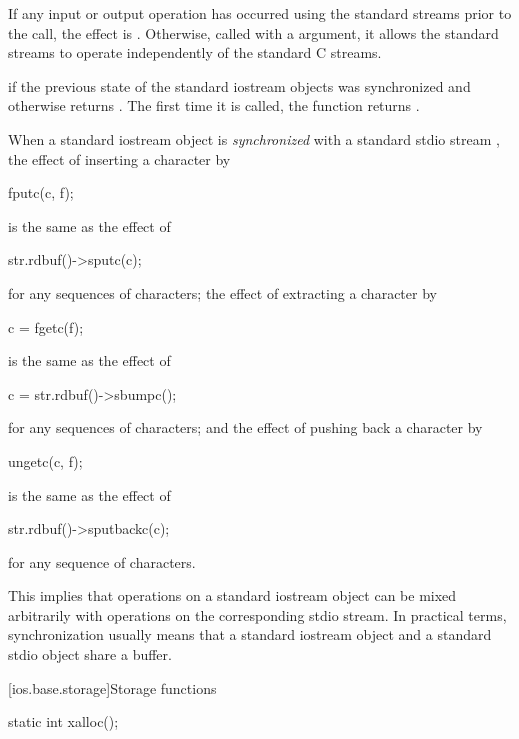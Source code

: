 \begin{itemdescr}
\pnum
\effects
If any input or output operation has occurred using the standard streams prior to the
call, the effect is
.
Otherwise, called with a  argument, it allows the standard streams to
operate independently of the standard C streams.

\pnum
\returns
{}
if the previous state of the standard iostream objects
was synchronized and otherwise returns
.
The first time it is called,
the function returns
.

\pnum
\remarks
When a standard iostream object  is
\textit{synchronized}
with a standard stdio stream , the effect of inserting a character  by
\begin{codeblock}
fputc(c, f);
\end{codeblock}
is the same as the effect of
\begin{codeblock}
str.rdbuf()->sputc(c);
\end{codeblock}
for any sequences of characters; the effect of extracting a character  by
\begin{codeblock}
c = fgetc(f);
\end{codeblock}
is the same as the effect of
\begin{codeblock}
c = str.rdbuf()->sbumpc();
\end{codeblock}
for any sequences of characters; and the effect of pushing back a character  by
\begin{codeblock}
ungetc(c, f);
\end{codeblock}
is the same as the effect of
\begin{codeblock}
str.rdbuf()->sputbackc(c);
\end{codeblock}
for any sequence of characters.
\begin{footnote}
This implies that operations on a standard iostream object can be mixed arbitrarily
with operations on the corresponding stdio stream. In practical terms, synchronization
usually means that a standard iostream object and a standard stdio object share a
buffer.
\end{footnote}
\end{itemdescr}

[ios.base.storage]{Storage functions}

%
\begin{itemdecl}
static int xalloc();
\end{itemdecl}


